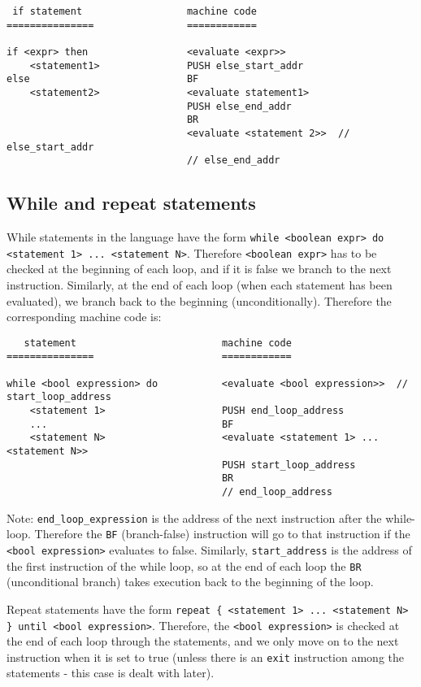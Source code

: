 \documentclass[11pt]{article}
\begin{document}
\begin{verbatim}
 if statement                  machine code
===============                ============

if <expr> then                 <evaluate <expr>>
    <statement1>               PUSH else_start_addr
else                           BF
    <statement2>               <evaluate statement1>
                               PUSH else_end_addr
                               BR
                               <evaluate <statement 2>>  // else_start_addr
                               // else_end_addr
\end{verbatim}

\subsection{While and repeat statements}

While statements in the language have the form \texttt{while <boolean expr> do <statement 1> ... <statement N>}. Therefore \texttt{<boolean expr>} has to be checked at the beginning of each loop, and if it is false we branch to the next instruction. Similarly, at the end of each loop (when each statement has been evaluated), we branch back to the beginning (unconditionally). Therefore the corresponding machine code is:

\begin{verbatim}
   statement                         machine code
===============                      ============

while <bool expression> do           <evaluate <bool expression>>  // start_loop_address
    <statement 1>                    PUSH end_loop_address
    ...                              BF
    <statement N>                    <evaluate <statement 1> ... <statement N>>
                                     PUSH start_loop_address
                                     BR
                                     // end_loop_address
\end{verbatim}

Note: \texttt{end\_loop\_expression} is the address of the next instruction after the while-loop. Therefore the \texttt{BF} (branch-false) instruction will go to that instruction if the \texttt{<bool expression>} evaluates to false. Similarly, \texttt{start\_address} is the address of the first instruction of the while loop, so at the end of each loop the \texttt{BR} (unconditional branch) takes execution back to the beginning of the loop.

Repeat statements have the form \texttt{repeat \{ <statement 1> ... <statement N> \} until <bool expression>}. Therefore, the \texttt{<bool expression>} is checked at the end of each loop through the statements, and we only move on to the next instruction when it is set to true (unless there is an \texttt{exit} instruction among the statements - this case is dealt with later).
\end{document}
